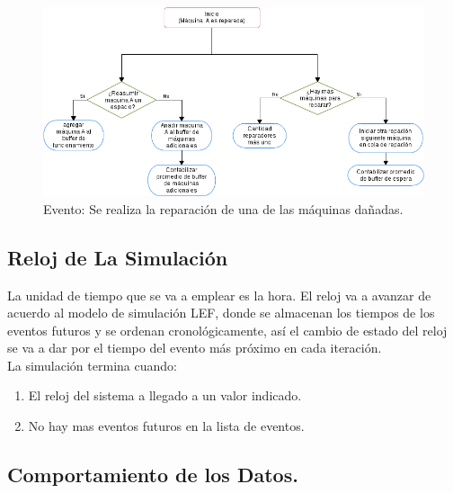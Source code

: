 \documentclass[10pt]{article}
\begin{document}
\begin{figure}
  \centering
  	\includegraphics[scale=0.5]{EventoReparacion.png} 
  \caption{Evento: Se realiza la reparación de una de las máquinas dañadas.}
  \label{fig:eventoreparacion}
\end{figure}




\subsection{Reloj de La Simulación}

La unidad de tiempo que se va a emplear es la hora. El reloj va a avanzar de acuerdo al modelo de simulación LEF, donde se almacenan los tiempos de los eventos futuros y se ordenan cronológicamente, así el cambio de estado del reloj  se va a dar por el tiempo del evento más próximo en cada iteración.\\

La simulación termina cuando:
\begin{enumerate}
\item El reloj del sistema a llegado a un valor indicado.
\item No hay mas eventos futuros en la lista de eventos.
\end{enumerate}

\subsection{Comportamiento de los Datos.}
\end{document}
